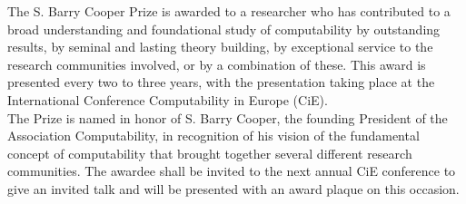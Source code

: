 \documentclass[prodmode,acmtecs]{acmsmall} %
\begin{document}
  The S. Barry Cooper Prize is awarded to a researcher who has contributed to a broad understanding and foundational study of computability by outstanding results, by seminal and lasting theory building, by exceptional service to the research communities involved, or by a combination of these. This award is presented every two to three years, with the presentation taking place at the International Conference Computability in Europe (CiE).\\ 
  The Prize is named in honor of S. Barry Cooper, the founding President of the Association Computability, in recognition of his vision of the fundamental concept of computability that brought together several different research communities. The awardee shall be invited to the next annual CiE conference to give an invited talk and will be presented with an award plaque on this occasion.\\ 
\end{document}
